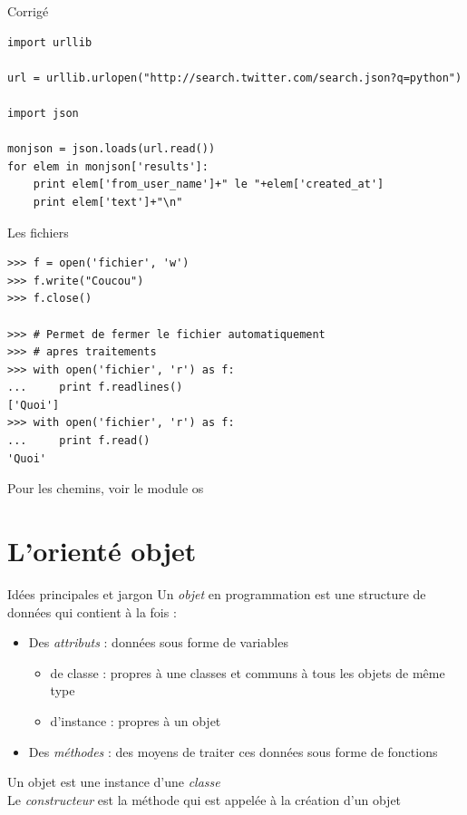 \documentclass{beamer}
\begin{document}
\begin{frame}[fragile]{Corrigé}
\begin{lstlisting}[basicstyle=\tiny]
import urllib

url = urllib.urlopen("http://search.twitter.com/search.json?q=python")

import json

monjson = json.loads(url.read())
for elem in monjson['results']:
    print elem['from_user_name']+" le "+elem['created_at']
    print elem['text']+"\n"
\end{lstlisting}
\end{frame}


\begin{frame}[fragile]{Les fichiers}
\begin{lstlisting}
>>> f = open('fichier', 'w')
>>> f.write("Coucou")
>>> f.close()

>>> # Permet de fermer le fichier automatiquement 
>>> # apres traitements
>>> with open('fichier', 'r') as f:
...     print f.readlines()
['Quoi']
>>> with open('fichier', 'r') as f:
...     print f.read()
'Quoi'
\end{lstlisting}
Pour les chemins, voir le module os
\end{frame}

\section{L'orienté objet}

\begin{frame}[fragile]{Idées principales et jargon}
Un \textit{objet} en programmation est une structure de données qui contient à la fois :
\begin{itemize}
 \item Des \textit{attributs} : données sous forme de variables
  \begin{itemize}
    \item de classe : propres à une classes et communs à tous les objets de même type
    \item d'instance : propres à un objet
  \end{itemize}
 \item Des \textit{méthodes} : des moyens de traiter ces données sous forme de fonctions 
\end{itemize}
Un objet est une instance d'une \textit{classe}\\
Le \textit{constructeur} est la méthode qui est appelée à la création d'un objet
\end{frame}
\end{document}
